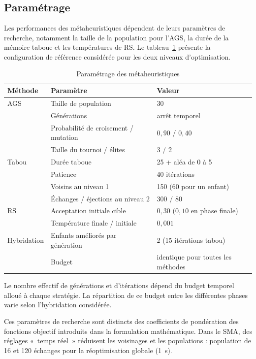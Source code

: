 \documentclass[11pt,a4paper]{article}
\begin{document}
\subsection{Paramétrage}

Les performances des métaheuristiques dépendent de leurs paramètres de recherche, notamment la taille de la population pour l'AGS, la durée de la mémoire taboue et les températures de RS. Le tableau~\ref{tab:parametres} présente la configuration de référence considérée pour les deux niveaux d'optimisation.

\begin{table}[htbp]
\centering
\footnotesize
\caption{Paramétrage des métaheuristiques }
\label{tab:parametres}
\begin{tabularx}{\linewidth}{@{}p{2.6cm}p{5.2cm}X@{}}
\toprule
\textbf{Méthode} & \textbf{Paramètre} & \textbf{Valeur} \\
\midrule
AGS
& Taille de population & 30 \\
& Générations & arrêt temporel \\
& Probabilité de croisement / mutation & $0{,}90$ / $0{,}40$ \\
& Taille du tournoi / élites & 3 / 2 \\
\midrule
Tabou
& Durée taboue & 25 + aléa de 0 à 5 \\
& Patience & 40 itérations \\
& Voisins au niveau 1 & 150 (60 pour un enfant) \\
& Échanges / éjections au niveau 2 & 300 / 80 \\
\midrule
RS
& Acceptation initiale cible & $0{,}30$ ($0{,}10$ en phase finale) \\
& Température finale / initiale & $0{,}001$ \\
\midrule
Hybridation
& Enfants améliorés par génération & 2 (15 itérations tabou) \\
& Budget & identique pour toutes les méthodes \\
\bottomrule
\end{tabularx}
\end{table}

Le nombre effectif de générations et d'itérations dépend du budget temporel alloué à chaque stratégie. La répartition de ce budget entre les différentes phases varie selon l’hybridation considérée.

Ces paramètres de recherche sont distincts des coefficients de pondération des fonctions objectif introduits dans la formulation mathématique. Dans le SMA, des réglages «~temps réel~» réduisent les voisinages et les populations : population de 16 et 120 échanges pour la réoptimisation globale (1~s).
\end{document}

